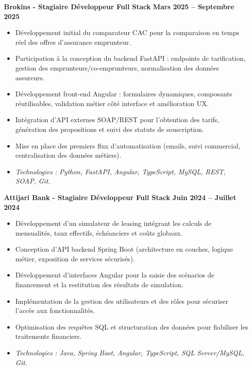 \documentclass[10pt,a4paper]{article}
\begin{document}
\vspace{6pt}
\textbf{Brokins - Stagiaire Développeur Full Stack} \hfill \textbf{Mars 2025 -- Septembre 2025}
\begin{itemize}
    \item Développement initial du comparateur CAC pour la comparaison en temps réel des offres d'assurance emprunteur.
    \item Participation à la conception du backend FastAPI : endpoints de tarification, gestion des emprunteurs/co-emprunteurs, normalisation des données assureurs.
    \item Développement front-end Angular : formulaires dynamiques, composants réutilisables, validation métier côté interface et amélioration UX.
    \item Intégration d'API externes SOAP/REST pour l'obtention des tarifs, génération des propositions et suivi des statuts de souscription.
    \item Mise en place des premiers flux d'automatisation (emails, suivi commercial, centralisation des données métiers).
    \item \textit{Technologies : Python, FastAPI, Angular, TypeScript, MySQL, REST, SOAP, Git.}
\end{itemize}

\vspace{6pt}
\textbf{Attijari Bank - Stagiaire Développeur Full Stack} \hfill \textbf{Juin 2024 -- Juillet 2024}
\begin{itemize}
    \item Développement d'un simulateur de leasing intégrant les calculs de mensualités, taux effectifs, échéanciers et coûts globaux.
    \item Conception d'API backend Spring Boot (architecture en couches, logique métier, exposition de services sécurisés).
    \item Développement d'interfaces Angular pour la saisie des scénarios de financement et la restitution des résultats de simulation.
    \item Implémentation de la gestion des utilisateurs et des rôles pour sécuriser l'accès aux fonctionnalités.
    \item Optimisation des requêtes SQL et structuration des données pour fiabiliser les traitements financiers.
    \item \textit{Technologies : Java, Spring Boot, Angular, TypeScript, SQL Server/MySQL, Git.}
\end{itemize}
\end{document}
